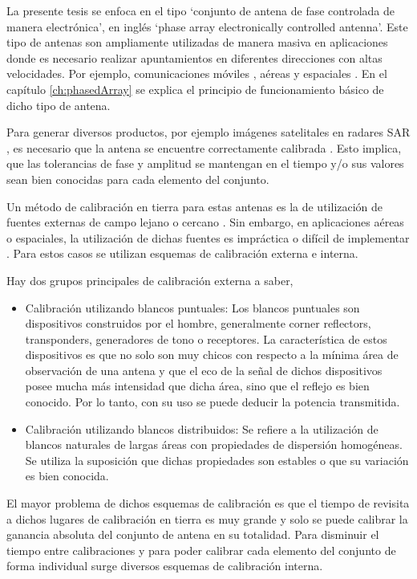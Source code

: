 La presente tesis se enfoca en el tipo \enquote*{conjunto de antena de fase controlada de manera electrónica}, en inglés
\enquote*{phase array electronically controlled antenna}. Este tipo de antenas son ampliamente utilizadas de manera masiva
en aplicaciones donde es necesario realizar apuntamientos en diferentes direcciones con altas velocidades. Por ejemplo,
comunicaciones móviles \cite{Chen2012}, aéreas \cite{MHong1989} y espaciales \cite{Shimada1995}\cite{Makhoul2012}. En el capítulo
\ref{ch:phasedArray} se explica el principio de funcionamiento básico de dicho tipo de antena.

Para generar diversos productos, por ejemplo imágenes satelitales en radares SAR \cite{Freeman1992}, es necesario que la
antena se encuentre correctamente calibrada \cite{Luscombe1990}\cite{Seifert1996}\cite{Dall1994}. Esto implica, que las
tolerancias de fase y amplitud se mantengan en el tiempo y/o sus valores sean bien conocidas para cada elemento del conjunto.

Un método de calibración en tierra para estas antenas es la de utilización de fuentes externas de campo lejano o cercano
\cite{Agrawal2003}. Sin embargo, en aplicaciones aéreas o espaciales, la utilización de dichas fuentes es impráctica o
difícil de implementar \cite{Aumann1989}. Para estos casos se utilizan esquemas de calibración externa e interna.

Hay dos grupos principales de calibración externa a saber,
\begin{itemize}
	\item Calibración utilizando blancos puntuales: Los blancos puntuales son dispositivos construidos por el hombre, generalmente
		corner reflectors, transponders, generadores de tono o receptores. La característica de estos dispositivos es que no
		solo son muy chicos con respecto a la mínima área de observación de una antena y que el eco de la señal de dichos
		dispositivos posee mucha más intensidad que dicha área, sino que el reflejo es bien conocido. Por lo tanto, con su uso
		se puede deducir la potencia transmitida.
	\item Calibración utilizando blancos distribuidos: Se refiere a la utilización de blancos naturales de largas áreas con
		propiedades de dispersión homogéneas. Se utiliza la suposición que dichas propiedades son estables o que su variación es
		bien conocida.
\end{itemize}

El mayor problema de dichos esquemas de calibración es que el tiempo de revisita a dichos lugares de calibración en tierra es muy
grande y solo se puede calibrar la ganancia absoluta del conjunto de antena en su totalidad. Para disminuir el tiempo entre
calibraciones y para poder calibrar cada elemento del conjunto de forma individual surge diversos esquemas de calibración
interna.

